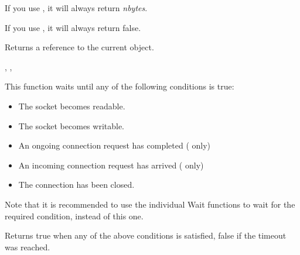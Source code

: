 If you use , it will always return {\it nbytes}.

If you use , it will always return false.





Returns a reference to the current object.


, 
, 

%
%
\label{wxsocketbasewait}


This function waits until any of the following conditions is true:
                                            
\begin{itemize}
\item The socket becomes readable.
\item The socket becomes writable.
\item An ongoing connection request has completed ( only)
\item An incoming connection request has arrived ( only)
\item The connection has been closed.
\end{itemize}

Note that it is recommended to use the individual Wait functions
to wait for the required condition, instead of this one.





Returns true when any of the above conditions is satisfied,
false if the timeout was reached.

